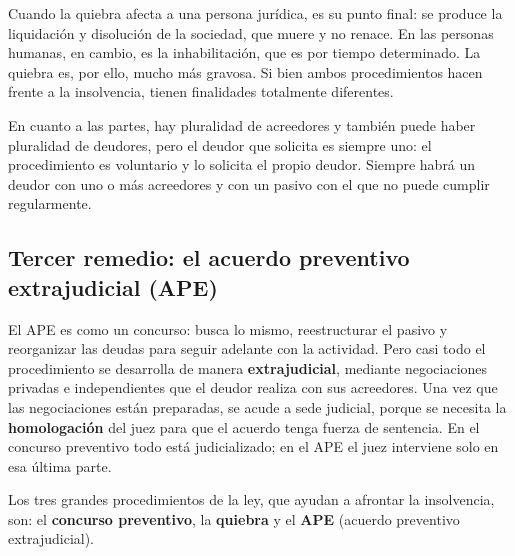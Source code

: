 \documentclass[12pt,oneside]{book}
\begin{document}
Cuando la quiebra afecta a una persona jurídica, es su punto final: se produce la liquidación y disolución de la sociedad, que muere y no renace. En las personas humanas, en cambio, es la inhabilitación, que es por tiempo determinado. La quiebra es, por ello, mucho más gravosa. Si bien ambos procedimientos hacen frente a la insolvencia, tienen finalidades totalmente diferentes.

En cuanto a las partes, hay pluralidad de acreedores y también puede haber pluralidad de deudores, pero el deudor que solicita es siempre uno: el procedimiento es voluntario y lo solicita el propio deudor. Siempre habrá un deudor con uno o más acreedores y con un pasivo con el que no puede cumplir regularmente.

\subsection{Tercer remedio: el acuerdo preventivo extrajudicial (APE)}

El APE es como un concurso: busca lo mismo, reestructurar el pasivo y reorganizar las deudas para seguir adelante con la actividad. Pero casi todo el procedimiento se desarrolla de manera \textbf{extrajudicial}, mediante negociaciones privadas e independientes que el deudor realiza con sus acreedores. Una vez que las negociaciones están preparadas, se acude a sede judicial, porque se necesita la \textbf{homologación} del juez para que el acuerdo tenga fuerza de sentencia. En el concurso preventivo todo está judicializado; en el APE el juez interviene solo en esa última parte.

\begin{important}
Los tres grandes procedimientos de la ley, que ayudan a afrontar la insolvencia, son: el \textbf{concurso preventivo}, la \textbf{quiebra} y el \textbf{APE} (acuerdo preventivo extrajudicial).
\end{important}
\end{document}
